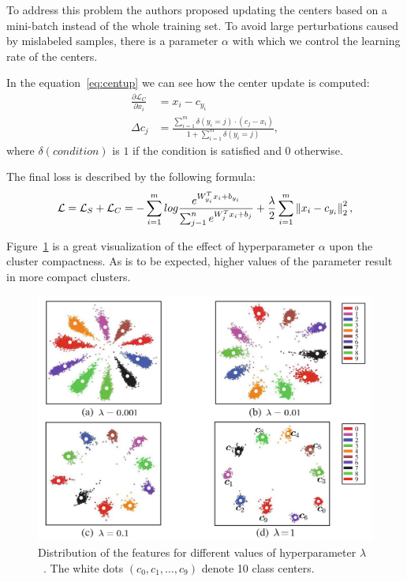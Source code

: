 To address this problem the authors proposed updating the centers based on a mini-batch instead of the whole training
set.
To avoid large perturbations caused by mislabeled samples, there is a parameter $\alpha$ with which we control the
learning rate of the centers.

In the equation~\ref{eq:centup} we can see how the center update is computed:
\begin{align}
    \frac{\partial \mathcal{L}_C}{\partial x_i} &= x_i - c_{y_i} \\
    \Delta c_j &= \frac{\sum_{i=1}^m \delta(y_i=j) \cdot (c_j-x_i)}{1+\sum_{i=1}^m \delta(y_i=j)}, \label{eq:centup}
\end{align}
where $\delta(condition)$ is $1$ if the condition is satisfied and $0$ otherwise.

The final loss is described by the following formula:
\begin{equation}
    \label{eq:centerloss}
    \mathcal{L} = \mathcal{L}_S + \mathcal{L}_C = -\sum_{i=1}^{m} log \frac{e^{W^T_{y_i} x_{i} + b_{y_i}}}
    {\sum_{j-1}^{n} e^{W^T_{j} x_{i} + b_{j}}} + \frac{\lambda}{2} \sum_{i=1}^{m} \left\lVert x_i - c_{y_i}\right\rVert_2^2,
\end{equation}

Figure~\ref{fig:centerlosslambda} is a great visualization of the effect of hyperparameter $\alpha$ upon the cluster
compactness.
As is to be expected, higher values of the parameter result in more compact clusters.

\begin{figure}[H]
    \centering
    \includegraphics[width=\columnwidth]{images/face-recognition/centerlosslambda.png}
    \caption{Distribution of the features for different values of hyperparameter $\lambda$~\cite{CenterLoss}.
    The white dots $(c_0,c_1,\dots,c_9)$ denote 10 class centers.}
    \label{fig:centerlosslambda}
\end{figure}


